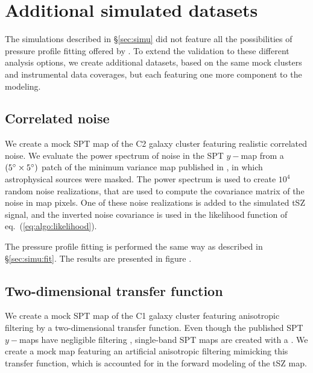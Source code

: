 \section{Additional simulated datasets} \label{sec:extra_simu}

The simulations described in \S\ref{sec:simu} did not feature all the possibilities of pressure profile fitting offered by \panco.
To extend the validation to these different analysis options, we create additional datasets, based on the same mock clusters and instrumental data coverages, but each featuring one more component to the modeling.

\subsection{Correlated noise} \label{sec:simi:corr_noise}

We create a mock SPT map of the C2 galaxy cluster featuring realistic correlated noise.
We evaluate the power spectrum of noise in the SPT $y-$map from a $(5\degree \times 5\degree)$ patch of the minimum variance map published in \citet{bleem_cmbksz_2022}, in which astrophysical sources were masked.
The power spectrum is used to create $10^4$ random noise realizations, that are used to compute the covariance matrix of the noise in map pixels.
One of these noise realizations is added to the simulated tSZ signal, and the inverted noise covariance is used in the likelihood function of eq.~(\ref{eq:algo:likelihood}).

The pressure profile fitting is performed the same way as described in \S\ref{sec:simu:fit}.
The results are presented in figure \todo.

\subsection{Two-dimensional transfer function} \label{sec:simu:2dtf}

We create a mock SPT map of the C1 galaxy cluster featuring anisotropic filtering by a two-dimensional transfer function.
Even though the published SPT $y-$maps have negligible filtering \citep[see][]{bleem_cmbksz_2022}, single-band SPT maps are created with a .
We create a mock map featuring an artificial anisotropic filtering mimicking this transfer function, which is accounted for in the forward modeling of the tSZ map.


